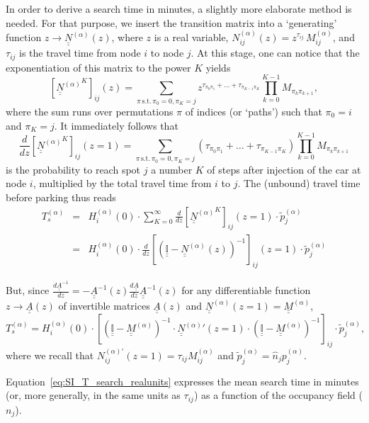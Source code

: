 \documentclass[trsc,reprint]{informs3}
\newcommand{\uul}[1]{\underline{\underline{#1}}}
\newcommand{\alp}{^{(\alpha)}}
\newcommand{\Id}{\uul{\mathbb{I}}}
\newcommand{\Ma}{ {\uul{M}\alp}}
\newcommand{\Na}{ {\uul{N}\alp}}
\begin{document}
\begin{APPENDICES}
In order to derive a search time in minutes, a slightly more elaborate method is needed. For that purpose, we insert the transition matrix into a `generating' function
$z \rightarrow \Na(z)$, where $z$ is a real variable, $N\alp_{ij}(z)=z^{\tau_{ij}}\,M_{ij}\alp$, and $\tau_{ij}$ is the travel time from node $i$ to node $j$. At this stage, one can notice
that the exponentiation of this matrix to the power $K$ yields
\begin{equation}
\left[ \Na^K \right]_{ij} (z) = \sum_{\pi\,\mathrm{s.t.}\,\pi_0=0,\pi_K=j}z^{\tau_{\pi_{0}\pi_{1}}+\ldots+\tau_{\pi_{K-1}\pi_{K}}} \prod_{k=0}^{K-1}M_{\pi_{k}\pi_{k+1}},
\end{equation}
where the sum runs over permutations $\pi$ of indices (or `paths') such that $\pi_0=i$ and $\pi_K=j$. It immediately follows that
\begin{equation}
\frac{d}{dz}\left[ \Na^K \right]_{ij}(z=1)=\sum_{\pi\,\mathrm{s.t.}\,\pi_0=0,\pi_K=j} \left(\tau_{\pi_{0}\pi_{1}}+\ldots+\tau_{\pi_{K-1}\pi_{K}}\right) \prod_{k=0}^{K-1}M_{\pi_{k}\pi_{k+1}}
\end{equation}
is the probability to reach spot $j$ a number $K$ of steps after injection of the car
at node $i$, multiplied by the total travel time from $i$ to $j$. The (unbound)
travel time before parking thus reads
\begin{eqnarray*}
T_{s}\alp & = & H_i\alp(0) \cdot \sum_{K=0}^{\infty}
           \frac{d}{dz}\left[\Na^{K}\right]_{ij}(z=1)\cdot \tilde{p}\alp_j \\
 & = & H_i\alp(0) \cdot \frac{d}{dz}\left[ \left(\Id-\Na(z)\right)^{-1}\right]_{ij}(z=1) \cdot \tilde{p}\alp_j 
\end{eqnarray*}

But, since
$\frac{d\uul{A}^{-1}}{dz}=-\uul{A}^{-1}(z)\frac{d\uul{A}}{dz}\uul{A}^{-1}(z)$ for any
 differentiable function $z \rightarrow \uul{A}(z)$ of invertible matrices $\uul{A}(z)$
and $\Na(z=1)=\Ma$,
\begin{equation}
T_{s}\alp  =  H_i\alp(0) \cdot
\left[\left(\Id-\Ma\right)^{-1}
    \cdot \Na'(z=1)
    \cdot \left(\Id - \Ma \right)^{-1}
\right]_{ij}
\cdot  \tilde{p}\alp_j,
\label{eq:SI_T_search_realunits}
\end{equation}
where we recall that $N_{ij}^{(\alpha)\prime}(z=1)=\tau_{ij} M\alp_{ij}$ and $\tilde{p}\alp_j=\hat{n}_{j}p\alp_j$.

Equation~\ref{eq:SI_T_search_realunits} expresses the mean search time in minutes (or, more generally, in the same units as $\tau_{ij}$) as a function of the occupancy field ($n_j$).



\end{APPENDICES}
\end{document}
